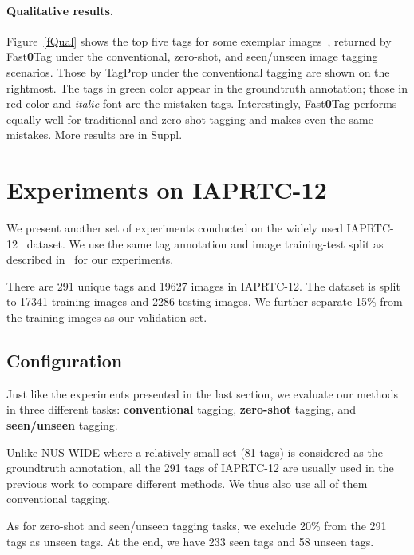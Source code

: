 \documentclass[10pt,twocolumn,letterpaper]{article}
\newcommand{\ours}{{Fast\textbf{0}Tag}}
\begin{document}
\paragraph{Qualitative results.}    Figure~\ref{fQual} shows the top five tags for  some exemplar images~\cite{chua_nus-wide:_2009}, returned by  {\ours} under the conventional, zero-shot, and seen/unseen image tagging scenarios. Those by TagProp under the conventional tagging are shown on the rightmost. The tags in {\color{green} green} color appear in the groundtruth annotation; those in {\color{red} red} color and \textit{italic} font are the mistaken tags. Interestingly, {\ours} performs equally well for traditional and zero-shot tagging and makes even the same mistakes. More results are in Suppl.





\section{Experiments on IAPRTC-12}  \label{sexp}

We present another set of experiments conducted on the widely used  IAPRTC-12~\cite{grubinger_iapr_2006} dataset. We use the same tag annotation and image training-test split as described in~\cite{guillaumin_tagprop:_2009} for our experiments. 

There are 291 unique tags and 19627 images in IAPRTC-12. The dataset is split to 17341  training images and 2286 testing images. We further separate 15\% from the training images as our validation set.

\subsection{Configuration}

Just like the experiments presented in the last section, we evaluate our methods in three different tasks: {\bf conventional} tagging, {\bf zero-shot} tagging, and {\bf seen/unseen} tagging. 

Unlike NUS-WIDE where a relatively small set (81 tags) is considered as the groundtruth annotation, all the 291 tags of IAPRTC-12 are usually used in the previous work to compare different methods. We thus also use all of them conventional tagging. 


As for zero-shot and seen/unseen tagging tasks, we exclude 20\%  from the 291 tags as unseen tags. At the end, we have 233 seen tags and 58 unseen tags.
\end{document}
